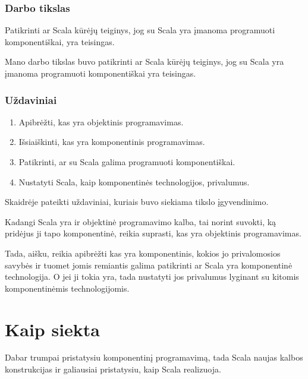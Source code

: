 \begin{frame}
  \frametitle{Darbo tikslas}
  Patikrinti ar Scala kūrėjų teiginys, jog su Scala yra įmanoma
  programuoti komponentiškai, yra teisingas.
  \begin{handout}
    Mano darbo tikslas buvo patikrinti ar Scala kūrėjų teiginys, jog
    su Scala yra įmanoma programuoti komponentiškai yra teisingas.
  \end{handout}
\end{frame}

\begin{frame}
  \frametitle{Uždaviniai}
  \begin{enumerate}
    \item Apibrėžti, kas yra objektinis programavimas.
    \item Išsiaiškinti, kas yra komponentinis programavimas.
    \item Patikrinti, ar su Scala galima programuoti komponentiškai.
    \item Nustatyti Scala, kaip komponentinės technologijos, privalumus.
  \end{enumerate}
  \begin{handout}
    Skaidrėje pateikti uždaviniai, kuriais buvo siekiama tikslo
    įgyvendinimo.

    Kadangi Scala yra ir objektinė programavimo kalba, tai
    norint suvokti, ką pridėjus ji tapo komponentinė, reikia
    suprasti, kas yra objektinis programavimas.

    Tada, aišku, reikia apibrėžti kas yra komponentinis, kokios jo
    privalomosios savybės ir tuomet jomis remiantis galima patikrinti
    ar Scala yra komponentinė technologija. O jei ji tokia yra,
    tada nustatyti jos privalumus lyginant su kitomis komponentinėmis
    technologijomis.
  \end{handout}
\end{frame}

\section{Kaip siekta}

\begin{handout}
  Dabar trumpai pristatysiu komponentinį programavimą, tada Scala
  naujas kalbos konstrukcijas ir galiausiai pristatysiu, kaip
  Scala realizuoja.
\end{handout}

